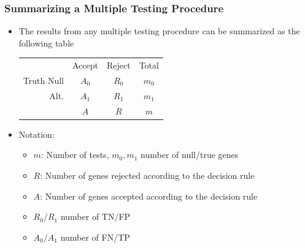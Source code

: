 \documentclass[xcolor=x11names,compress]{beamer}\usepackage[]{graphicx}\usepackage[]{color}
\begin{document}
\begin{frame}
  \frametitle{Summarizing a Multiple Testing Procedure}
  \begin{itemize}
\item The results from any multiple testing procedure can be summarized
      as the following table
  \begin{center}
  \begin{tabular}{r|c|c|c}
    & Accept & Reject & Total \\
   \cline{1-4}
  Truth Null & $A_0$ & $R_0$ & $m_0$ \\
  \cline{1-4}
  Alt. & $A_1$ & $R_1$ & $m_1$ \\
  \cline{1-4} 
    & $A$ & $R$ & $m$
  \end{tabular}
  \end{center}
  \item Notation:
    \begin{itemize}
    \item $m$: Number of tests, $m_0,m_1$ number of null/true genes
    \item $R$: Number of genes rejected according to the decision rule
    \item $A$: Number of genes accepted according to the decision rule
    \item $R_0/R_1$ number of TN/FP
    \item $A_0/A_1$ number of FN/TP
    \end{itemize}
    
    \end{itemize}

\end{frame}
\end{document}

